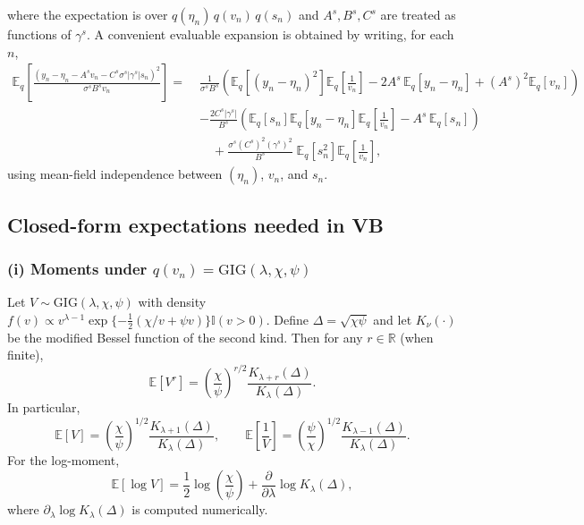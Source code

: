 \documentclass[11pt]{article}
\newcommand{\R}{\mathbb{R}}
\newcommand{\1}{\mathbb{I}}
\newcommand{\GIG}{\mathrm{GIG}}
\newcommand{\E}{\mathbb{E}}
\begin{document}
where the expectation is over $q(\eta_n)\,q(v_n)\,q(s_n)$ and $A^s,B^s,C^s$ are treated as functions of $\gamma^s$.
A convenient evaluable expansion is obtained by writing, for each $n$,
\begin{align}
\E_q\!\left[\frac{(y_n-\eta_n-A^s v_n-C^s\sigma^s|\gamma^s|s_n)^2}{\sigma^s B^s v_n}\right]
=\;&
\frac{1}{\sigma^s B^s}\left(
\E_q[(y_n-\eta_n)^2]\E_q\!\left[\frac{1}{v_n}\right]
-2A^s\,\E_q[y_n-\eta_n]
+(A^s)^2\E_q[v_n]\right)\nonumber\\
	&-\frac{2C^s|\gamma^s|}{B^s}\left(
	\E_q[s_n]\E_q[y_n-\eta_n]\E_q\!\left[\frac{1}{v_n}\right]
	-A^s\,\E_q[s_n]\right)\nonumber\\
	&\quad+\frac{\sigma^s (C^s)^2(\gamma^s)^2}{B^s}\;\E_q[s_n^2]\E_q\!\left[\frac{1}{v_n}\right],
	\label{eq:vb_quad_expand}
	\end{align}
using mean-field independence between $(\eta_n)$, $v_n$, and $s_n$.

\subsection{Closed-form expectations needed in VB}

\subsubsection*{(i) Moments under $q(v_n)=\GIG(\lambda,\chi,\psi)$}
Let $V\sim\GIG(\lambda,\chi,\psi)$ with density
$f(v)\propto v^{\lambda-1}\exp\{-\tfrac12(\chi/v+\psi v)\}\1(v>0)$.
Define $\Delta=\sqrt{\chi\psi}$ and let $K_\nu(\cdot)$ be the modified Bessel function of the second kind.
Then for any $r\in\R$ (when finite),
\begin{equation}
\E[V^r] = \left(\frac{\chi}{\psi}\right)^{r/2}\frac{K_{\lambda+r}(\Delta)}{K_{\lambda}(\Delta)}.
\label{eq:gig_moment_general}
\end{equation}
In particular,
\begin{equation}
\E[V]=\left(\frac{\chi}{\psi}\right)^{1/2}\frac{K_{\lambda+1}(\Delta)}{K_\lambda(\Delta)},
\qquad
\E\!\left[\frac{1}{V}\right]=\left(\frac{\psi}{\chi}\right)^{1/2}\frac{K_{\lambda-1}(\Delta)}{K_\lambda(\Delta)}.
\label{eq:gig_moments_1}
\end{equation}
For the log-moment,
\begin{equation}
\E[\log V] = \frac12\log\!\left(\frac{\chi}{\psi}\right) + \frac{\partial}{\partial\lambda}\log K_\lambda(\Delta),
\label{eq:gig_log_moment}
\end{equation}
where $\partial_\lambda \log K_\lambda(\Delta)$ is computed numerically.
\end{document}
